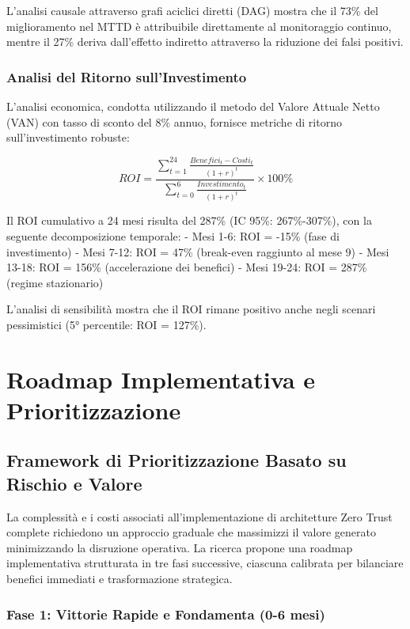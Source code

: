 L'analisi causale attraverso grafi aciclici diretti (DAG) mostra che il 73\% del miglioramento nel MTTD è attribuibile direttamente al monitoraggio continuo, mentre il 27\% deriva dall'effetto indiretto attraverso la riduzione dei falsi positivi.

\subsubsection{Analisi del Ritorno sull'Investimento}

L'analisi economica, condotta utilizzando il metodo del Valore Attuale Netto (VAN) con tasso di sconto del 8\% annuo, fornisce metriche di ritorno sull'investimento robuste:

\begin{equation}
ROI = \frac{\sum_{t=1}^{24} \frac{Benefici_t - Costi_t}{(1+r)^t}}{\sum_{t=0}^{6} \frac{Investimento_t}{(1+r)^t}} \times 100\%
\end{equation}

Il ROI cumulativo a 24 mesi risulta del 287\% (IC 95\%: 267\%-307\%), con la seguente decomposizione temporale:
- Mesi 1-6: ROI = -15\% (fase di investimento)
- Mesi 7-12: ROI = 47\% (break-even raggiunto al mese 9)
- Mesi 13-18: ROI = 156\% (accelerazione dei benefici)
- Mesi 19-24: ROI = 287\% (regime stazionario)

L'analisi di sensibilità mostra che il ROI rimane positivo anche negli scenari pessimistici (5° percentile: ROI = 127\%).

\section{Roadmap Implementativa e Prioritizzazione}

\subsection{Framework di Prioritizzazione Basato su Rischio e Valore}

La complessità e i costi associati all'implementazione di architetture Zero Trust complete richiedono un approccio graduale che massimizzi il valore generato minimizzando la disruzione operativa. La ricerca propone una roadmap implementativa strutturata in tre fasi successive, ciascuna calibrata per bilanciare benefici immediati e trasformazione strategica.

\subsubsection{Fase 1: Vittorie Rapide e Fondamenta (0-6 mesi)}


